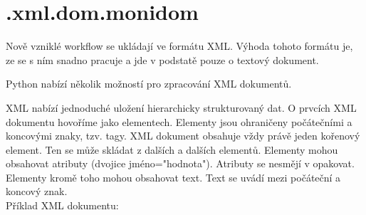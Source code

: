 \newpage
\section{.xml.dom.monidom}
\nocite{python:www}
\nocite{py3:book}

Nově vzniklé workflow se ukládají ve formátu  XML. Výhoda tohoto formátu je, ze se s ním snadno pracuje a jde v podstatě pouze o textový dokument.

Python nabízí několik možností pro zpracování XML dokumentů.

XML nabízí jednoduché uložení hierarchicky strukturovaný dat. O prvcích XML dokumentu hovoříme jako elementech. Elementy jsou ohraničeny počátečními a koncovými znaky, tzv. tagy. XML dokument obsahuje vždy právě jeden kořenový element. Ten se může skládat z dalších a dalších elementů. Elementy mohou obsahovat atributy (dvojice jméno="hodnota").  Atributy se nesmějí v opakovat. Elementy kromě toho mohou obsahovat text. Text se uvádí mezi počáteční a koncový znak. \\

\noindent Příklad XML dokumentu:\\





